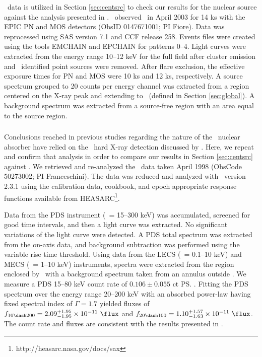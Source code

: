 \documentclass[useAMS,usenatbib]{mn2e}
\begin{document}
\xmm\ data is utilized in Section \ref{sec:centsrc} to check our
results for the nuclear source against the analysis presented in
\citet{2007A&A...473...85P}. \xmm\ observed \irs\ in April 2003 for 14
ks with the EPIC PN and MOS detectors (ObsID 0147671001; PI
Fiore). Data was reprocessed using SAS version 7.1 and CCF release
258. Events files were created using the tools {\textsc{EMCHAIN}} and
{\textsc{EPCHAIN}} for patterns 0--4. Light curves were extracted from
the energy range 10--12 keV for the full field after cluster emission
and \chandra\ identified point sources were removed. After flare
exclusion, the effective exposure times for PN and MOS were 10 ks and
12 ks, respectively. A source spectrum grouped to 20 counts per energy
channel was extracted from a region centered on the X-ray peak and
extending to \rf\ (defined in Section \ref{sec:global}). A background
spectrum was extracted from a source-free region with an area equal to
the source region.

\subsubsection{\bepposax}

Conclusions reached in previous studies regarding the nature of the
\irs\ nuclear absorber have relied on the \bepposax\ hard X-ray
detection discussed by \citet{2000A&A...353..910F}. Here, we repeat
and confirm that analysis in order to compare our results in Section
\ref{sec:centsrc} against \citet{2000A&A...353..910F}. We retrieved
and re-analyzed the \bepposax\ data taken April 1998 (ObsCode
50273002; PI Franceschini). The data was reduced and analyzed with
\saxdas\ version 2.3.1 using the calibration data, cookbook, and epoch
appropriate response functions available from
HEASARC\footnote{http://heasarc.nasa.gov/docs/sax}.

Data from the PDS instrument (\esens\ = 15--300 keV) was accumulated,
screened for good time intervals, and then a light curve was
extracted. No significant variations of the light curve were
detected. A PDS total spectrum was extracted from the on-axis data,
and background subtraction was performed using the variable rise time
threshold. Using data from the LECS (\esens\ = 0.1--10 keV) and MECS
(\esens\ = 1--10 keV) instruments, spectra were extracted from the
region enclosed by \rf\ with a background spectrum taken from an
annulus outside \rf. We measure a PDS 15--80 keV count rate of $0.106
\pm 0.055$ ct \ps. Fitting the PDS spectrum over the energy range
20--200 keV with an absorbed power-law having fixed spectral index of
$\Gamma = 1.7$ yielded fluxes of $f_{10 \dash 200} =
2.09^{+1.95}_{-1.95} \times 10^{-11} ~\flux$ and $f_{20 \dash 100} =
1.10^{+1.57}_{-1.63} \times 10^{-11} ~\flux$. The count rate and
fluxes are consistent with the results presented in
\citet{2000A&A...353..910F}.
\end{document}
